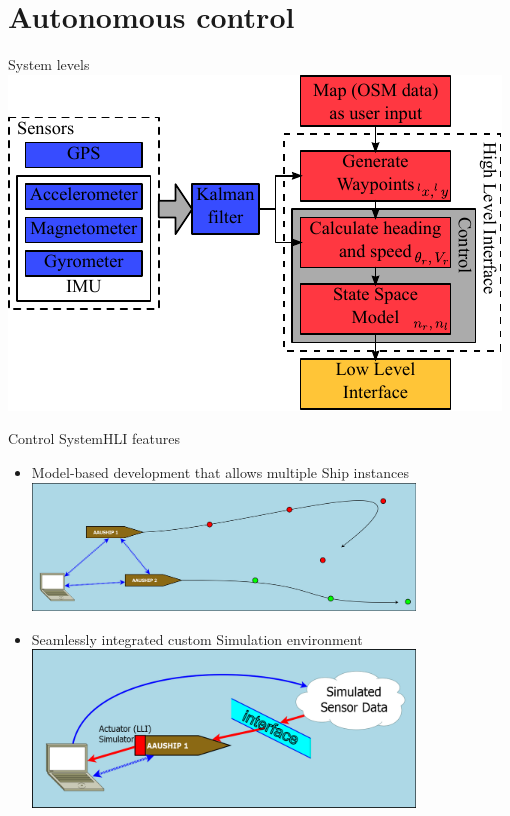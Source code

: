 \section{Autonomous control}
\begin{frame}{System levels}
    \includegraphics[width = \textwidth]{control/img/vessel-block-overview}
\end{frame}

\begin{frame}{Control System}{HLI features}
		\begin{itemize}
			\item Model-based development that allows multiple Ship instances
			\centering
			\includegraphics[trim = 5mm 5mm 5mm 5mm, clip, width = 0.8\textwidth]{control/img/actor-model}
			\item Seamlessly integrated custom Simulation environment
			\centering
			\includegraphics[trim = 5mm 5mm 5mm 5mm, clip, width = 0.8\textwidth]{control/img/simmodel}
		\end{itemize}
\end{frame}

